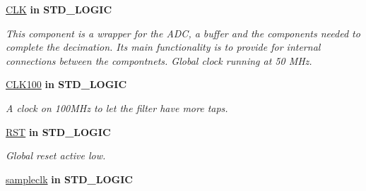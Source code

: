  \begin{DoxyCompactItemize}
\item 
\hypertarget{classADC__TOP_a9a17c21e2258ab6c61274f510b7ec756}{\hyperlink{classADC__TOP_a9a17c21e2258ab6c61274f510b7ec756}{C\-L\-K}  {\bfseries {\bfseries \textcolor{vhdlkeyword}{in}\textcolor{vhdlchar}{ }}} {\bfseries \textcolor{comment}{S\-T\-D\-\_\-\-L\-O\-G\-I\-C}\textcolor{vhdlchar}{ }} }\label{classADC__TOP_a9a17c21e2258ab6c61274f510b7ec756}

\begin{DoxyCompactList}\small\item\em This component is a wrapper for the A\-D\-C, a buffer and the components needed to complete the decimation. Its main functionality is to provide for internal connections between the compontnets. Global clock running at 50 M\-Hz. \end{DoxyCompactList}\item 
\hypertarget{classADC__TOP_ab1f7becce7cb29d94bb2f2ec187f72a4}{\hyperlink{classADC__TOP_ab1f7becce7cb29d94bb2f2ec187f72a4}{C\-L\-K100}  {\bfseries {\bfseries \textcolor{vhdlkeyword}{in}\textcolor{vhdlchar}{ }}} {\bfseries \textcolor{comment}{S\-T\-D\-\_\-\-L\-O\-G\-I\-C}\textcolor{vhdlchar}{ }} }\label{classADC__TOP_ab1f7becce7cb29d94bb2f2ec187f72a4}

\begin{DoxyCompactList}\small\item\em A clock on 100\-M\-Hz to let the filter have more taps. \end{DoxyCompactList}\item 
\hypertarget{classADC__TOP_a91cf794d165cc0a740042335a6062940}{\hyperlink{classADC__TOP_a91cf794d165cc0a740042335a6062940}{R\-S\-T}  {\bfseries {\bfseries \textcolor{vhdlkeyword}{in}\textcolor{vhdlchar}{ }}} {\bfseries \textcolor{comment}{S\-T\-D\-\_\-\-L\-O\-G\-I\-C}\textcolor{vhdlchar}{ }} }\label{classADC__TOP_a91cf794d165cc0a740042335a6062940}

\begin{DoxyCompactList}\small\item\em Global reset active low. \end{DoxyCompactList}\item 
\hypertarget{classADC__TOP_a4696bc4e06c727fae1b8ce3ba8cf08d4}{\hyperlink{classADC__TOP_a4696bc4e06c727fae1b8ce3ba8cf08d4}{sampleclk}  {\bfseries {\bfseries \textcolor{vhdlkeyword}{in}\textcolor{vhdlchar}{ }}} {\bfseries \textcolor{comment}{S\-T\-D\-\_\-\-L\-O\-G\-I\-C}\textcolor{vhdlchar}{ }} }\label{classADC__TOP_a4696bc4e06c727fae1b8ce3ba8cf08d4}


\end{DoxyCompactItemize}
